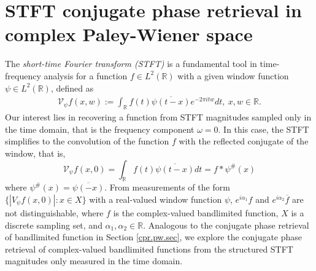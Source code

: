 \documentclass[12pt,oneside,reqno]{amsart}
\newcommand{\R}{\mathbb{R}}
\numberwithin{equation}{section}
\begin{document}
\section{STFT conjugate phase retrieval in complex Paley-Wiener space}\label{stft.pw.sec}

The \textit{short-time Fourier transform (STFT)}  is a fundamental tool in time-frequency analysis for a function $f\in L^2(\R)$ with  a given window function  $\psi\in L^2(\R)$, defined as
\begin{align*}
	\mathcal{V}_\psi f(x,w):= \int_{\R} f(t)\overline{\psi(t-x)}e^{-2\pi itw}dt, \  x,w\in \R. 
\end{align*} 
Our interest lies in recovering a function from STFT magnitudes sampled only in the time domain, that is the frequency component $\omega=0$. In this case, the STFT simplifies to the convolution of the function $f$ with the reflected conjugate of the window, that is, 
 $$ \mathcal{V}_{\psi} f(x,0) = \int_{\R} f(t)\overline{\psi(t-x)} dt= f\ast \psi^\# (x)$$ 
where $\psi^\#(x) = \overline{\psi(-x)}$. 
From measurements of the form $\{|V_{\psi}f(x, 0)|: x\in X\}$ with a real-valued window function $\psi$, $e^{i\alpha_1} f$ and $e^{i\alpha_2} \overline{f}$ are not distinguishable, where $f$ is the complex-valued bandlimited function,  $X$ is a discrete sampling set, and $\alpha_1, \alpha_2\in \R$.   Analogous  to the conjugate phase retrieval of bandlimited function in Section \ref{cpr.pw.sec}, we explore the   conjugate phase retrieval of complex-valued bandlimited functions from   the structured  STFT magnitudes only measured in the time domain.


\end{document}
